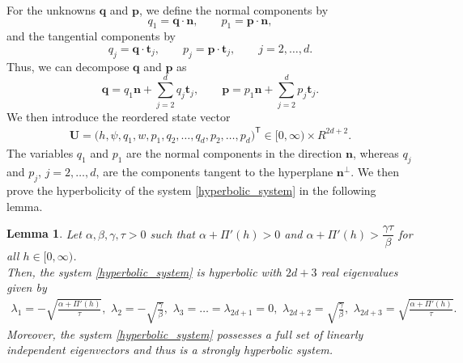 \documentclass[11pt]{article}
\numberwithin{equation}{section}
\newtheorem{lemma}[theorem]{Lemma}
\newtheorem{counter example}[theorem]{Counter Example}
\numberwithin{equation}{section}
\numberwithin{equation}{section}
\begin{document}
For the unknowns $\mathbf{q}$ and $\mathbf{p}$, we define the normal components by
\[
q_1=\mathbf q\cdot\mathbf n,
\qquad
p_1=\mathbf p\cdot\mathbf n,
\]
and the tangential components by
\[
q_j=\mathbf q\cdot\mathbf t_j,
\qquad
p_j=\mathbf p\cdot\mathbf t_j,
\qquad j=2,\ldots,d.
\]
Thus, we can decompose $\mathbf{q}$ and $\mathbf{p}$ as
\[
\mathbf q
=
q_1\mathbf n+\sum_{j=2}^d q_j\mathbf t_j,
\qquad
\mathbf p
=
p_1\mathbf n+\sum_{j=2}^d p_j\mathbf t_j.
\]
We then introduce the reordered state vector
\begin{align}\label{U_vector}
\mathbf U
=
\bigl(
h,\psi,q_1,w,p_1,
q_2,\ldots,q_d,p_2,\ldots,p_d
\bigr)^{\mathsf T}
\in\mathbb [0, \infty)\times R^{2d+2}.
\end{align}
The variables $q_1$ and $p_1$ are the normal components in the
direction $\mathbf n$, whereas $q_j$ and $p_j$, $j=2,\ldots,d$, are
the components tangent to the hyperplane $\mathbf n^\perp$. We then prove the hyperbolicity of the system \eqref{hyperbolic_system} in the following lemma.
\begin{lemma}
Let $\alpha, \beta,\gamma, \tau>0$ such that $\alpha+\Pi'(h)>0$ and $\alpha+\Pi'(h)> \dfrac{\gamma \tau}{\beta}$ for all $h\in [0, \infty)$. \\
Then, the system \eqref{hyperbolic_system} is hyperbolic with $2d+3$ real eigenvalues given by
\begin{equation}\label{eigen_values}
\begin{aligned}
\lambda_1=-\sqrt{\frac{\alpha+\Pi'(h)}{\tau}},\,\,\lambda_2=-\sqrt{\frac{\gamma}{\beta}},\,\,
\lambda_{3}=\ldots=\lambda_{2d+1}=0,\,\,\lambda_{2d+2}
=\sqrt{\frac{\gamma}{\beta}},\,\,\lambda_{2d+3}=\sqrt{\frac{\alpha+\Pi'(h)}{\tau}}
.
\end{aligned}
\end{equation}
Moreover, the system \eqref{hyperbolic_system} possesses a full set of linearly independent eigenvectors and thus is a strongly hyperbolic system.
\end{lemma}
\end{document}
